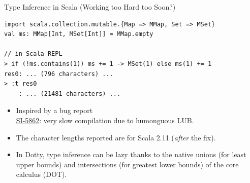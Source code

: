 \documentclass{beamer}
\begin{document}
\begin{frame}[fragile]{Type Inference in Scala (Working too Hard too Soon?)}
\begin{verbatim}
import scala.collection.mutable.{Map => MMap, Set => MSet}
val ms: MMap[Int, MSet[Int]] = MMap.empty

// in Scala REPL
> if (!ms.contains(1)) ms += 1 -> MSet(1) else ms(1) += 1
res0: ... (796 characters) ...
> :t res0
    : ... (21481 characters) ...
\end{verbatim}
\begin{itemize}
\item Inspired by a bug report\\
\href{https://issues.scala-lang.org/browse/SI-5862}{SI-5862}: very slow compilation due to humonguous LUB.
\item The character lengths reported are for Scala 2.11 ({\em after} the fix).
\item In Dotty, type inference can be lazy thanks to the native unions (for least upper bounds) and intersections (for greatest lower bounds) of the core calculus (DOT).
\end{itemize}
\end{frame}
\end{document}
